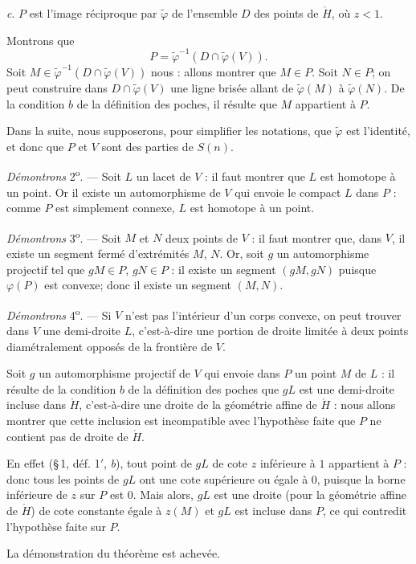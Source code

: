 \documentclass[11pt]{article}
\newcommand{\bzcf}[2]{#1}
\newenvironment{proof}[1][]{\par}{\par}
\begin{document}
\begin{proof}
\textit{c}. $P$ est l'image réciproque par $\tilde{\varphi}$ de l'ensemble $D$ des points de
$\mathring{H}$, où $z<1$.

Montrons que
\[ P=\tilde{\varphi}^{-1}(D\cap\tilde{\varphi}(V)). \]
Soit $M\in\tilde{\varphi}^{-1}(D\cap\tilde{\varphi}(V))$ nous : allons montrer que $M\in P$. Soit
$N\in P$; on peut construire dans $D\cap\tilde{\varphi}(V)$ une ligne brisée allant de
$\tilde{\varphi}(M)$ à $\tilde{\varphi}(N)$. De la condition $b$ de \bzcf{la définition des
poches}{\ref{bzdef:c2s1d1prime_poche_projective}}, il résulte que $M$ appartient à $P$.

Dans la suite, nous supposerons, pour simplifier les notations, que $\tilde{\varphi}$ est
l'identité, et donc que $P$ et $V$ sont des parties de $S(n)$.

\textit{Démontrons} 2\textsuperscript{o}. --- Soit $L$ un lacet de $V$ : il faut montrer que $L$
est homotope à un point. Or il existe un automorphisme de $V$ qui envoie le compact $L$ dans $P$ :
comme $P$ est simplement connexe, $L$ est homotope à un point.

\textit{Démontrons} 3\textsuperscript{o}. --- Soit $M$ et $N$ deux points de $V$ : il faut
montrer que, dans $V$, il existe un segment fermé d'extrémités $M$, $N$. Or, soit $g$ un
automorphisme projectif tel que $gM\in P$, $gN\in P$ : il existe un segment $(gM, gN)$ puisque
$\varphi(P)$ est convexe; donc il existe un segment $(M, N)$.

\textit{Démontrons} 4\textsuperscript{o}. --- Si $V$ n'est pas l'intérieur d'un corps convexe, on
peut trouver dans $V$ une demi-droite $L$, c'est-à-dire une portion de droite limitée à deux
points diamétralement opposés de la frontière de $V$.

Soit $g$ un automorphisme projectif de $V$ qui envoie dans $P$ un point $M$ de $L$ : il résulte de
la condition $b$ de \bzcf{la définition des poches}{\ref{bzdef:c2s1d1prime_poche_projective}} que
$gL$ est une demi-droite incluse dans $\mathring{H}$, c'est-à-dire une droite de la géométrie
affine de $\mathring{H}$ : nous allons montrer que cette inclusion est incompatible avec
l'hypothèse faite que $P$ ne contient pas de droite de $\mathring{H}$.

En effet (\bzcf{\S\,1, déf. 1$'$, \textit{b}}{\ref{bzdef:c2s1d1prime_poche_projective}}), tout
point de $gL$ de cote $z$ inférieure à $1$ appartient à $P$ : donc tous les points de $gL$ ont une
cote supérieure ou égale à $0$, puisque la borne inférieure de $z$ sur $P$ est $0$. Mais alors,
$gL$ est une droite (pour la géométrie affine de $\mathring{H}$) de cote constante égale à $z(M)$
et $gL$ est incluse dans $P$, ce qui contredit l'hypothèse faite sur $P$.

La démonstration du théorème est achevée.
\end{proof}
\end{document}
